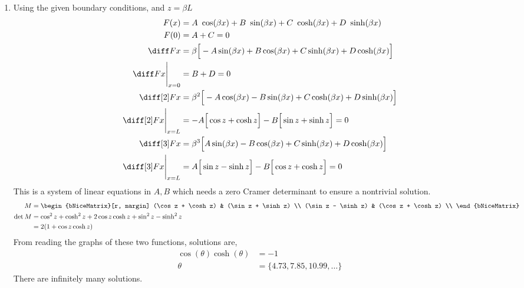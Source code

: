 \begin{enumerate}
    \item Using the given boundary conditions, and $ z = \beta L $
          \begin{align}
              F(x)                    & = A\ \cos(\beta x) + B\ \sin(\beta x)
              + C\ \cosh(\beta x) + D\ \sinh(\beta x)                                  \\
              F(0)                    & = A + C = 0                                    \\
              \diff Fx                & = \beta \Big[ -A\sin(\beta x) + B\cos(\beta x)
              + C \sinh(\beta x) + D \cosh(\beta x) \Big]                              \\
              \diff Fx\Bigg|_{x=0}    & = B + D = 0                                    \\
              \diff[2] Fx             & = \beta^2 \Big[ -A\cos(\beta x)
              - B\sin(\beta x) + C \cosh(\beta x) + D \sinh(\beta x) \Big]             \\
              \diff[2] Fx\Bigg|_{x=L} & = -A \Big[ \cos z + \cosh z \Big]
              - B \Big[ \sin z + \sinh z \Big] = 0                                     \\
              \diff[3] Fx             & = \beta^3 \Big[ A\sin(\beta x)
              - B\cos(\beta x) + C \sinh(\beta x) + D \cosh(\beta x) \Big]             \\
              \diff[3] Fx\Bigg|_{x=L} & = A \Big[ \sin z - \sinh z \Big]
              - B \Big[ \cos z + \cosh z \Big] = 0
          \end{align}
          This is a system of linear equations in $ A, B $ which needs a zero
          Cramer determinant to ensure a nontrivial solution.
          \begin{align}
              M       & = \begin{bNiceMatrix}[r, margin]
                              (\cos z + \cosh z) & (\sin z + \sinh z) \\
                              (\sin z - \sinh z) & (\cos z + \cosh z) \\
                          \end{bNiceMatrix} \\
              \det{M} & = \cos^2 z + \cosh^2 z + 2\cos z \cosh z
              + \sin^2 z - \sinh^2 z                              \\
                      & = 2(1 + \cos z \cosh z)
          \end{align}
          From reading the graphs of these two functions, solutions are,
          \begin{align}
              \cos(\theta) \cosh(\theta) & = -1                           \\
              \theta                     & = \{4.73, 7.85, 10.99, \dots\}
          \end{align}
          There are infinitely many solutions.
\end{enumerate}